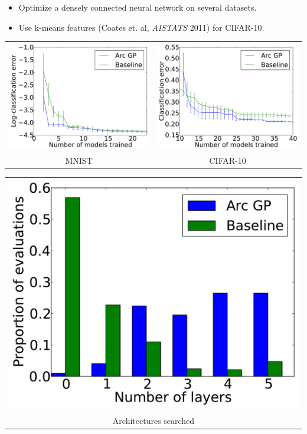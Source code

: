 \documentclass[landscape,a0b,final,a4resizeable]{include/a0poster}
\begin{document}
\begin{poster}
\begin{multicols}{3}
	\begin{itemize}
		\item Optimize a densely connected neural network on several datasets.
		\item Use k-means features (Coates et. al, \emph{AISTATS} 2011) for CIFAR-10.
	\end{itemize}
	\centering
\begin{tabular}{cc}
\includegraphics[width=0.45\columnwidth]{figures/mnist.pdf} &
\includegraphics[width=0.45\columnwidth]{figures/cifar10.pdf} \\
MNIST &  CIFAR-10
\end{tabular}		


\begin{tabular}{c}
		\includegraphics[width=0.45\columnwidth]{figures/fevals_per_layer.pdf} \\
Architectures searched
\end{tabular}
		



\end{multicols}
\end{poster}
\end{document}
